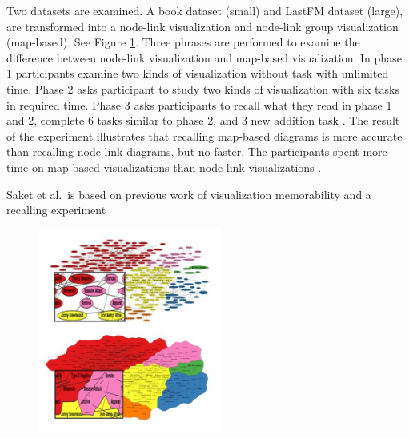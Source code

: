 \documentclass{egpubl}
\begin{document}
Two datasets are examined. A book dataset (small) and LastFM dataset (large), are transformed into a node-link visualization and node-link group visualization (map-based). See Figure \ref{fig:saket2015}.
Three phrases are performed to examine the difference between node-link visualization and map-based visualization. In phase 1 participants examine two kinds of visualization without task with unlimited time. Phase 2 asks participant to study two kinds of visualization with six tasks in required time. Phase 3 asks participants to recall what they read in phase 1 and 2, complete 6 tasks similar to phase 2, and 3 new addition task \cite{saket2015}.
The result of the experiment illustrates that recalling map-based diagrams is more accurate than recalling node-link diagrams, but no faster.
The participants spent more time on map-based visualizations than node-link visualizations \cite{saket2015}.  

Saket et al.\ is based on previous work of visualization memorability \cite{bateman} and a recalling experiment \cite{isola2011}
\begin{figure}
\begingroup
\centering
\includegraphics[width=6cm]{./images/saket2015}
\label{fig:saket2015}
\endgroup
\end{figure}
\end{document}
